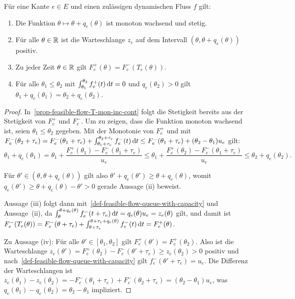 \begin{proposition}\label{prop-feasible-flow}
	Für eine Kante $e\in E$ und einen zulässigen dynamischen Fluss $f$ gilt:
	\begin{enumerate}[label=(\roman*)]
		\item\label{prop-feasible-flow-T-mon-inc-cont} Die Funktion $\theta \mapsto \theta + q_e(\theta)$ ist monoton wachsend und stetig.
		\item\label{prop-feasible-flow-positive-queue} Für alle $\theta\in\mathbb{R}$ ist die Warteschlange $z_e$ auf dem Intervall $(\theta, \theta + q_e(\theta))$ positiv.
		\item\label{prop-feasible-flow-det-outflow} Zu jeder Zeit $\theta\in\mathbb{R}$ gilt $F_e^+(\theta) = F_e^-(T_e(\theta))$.
		\item\label{prop-feasible-flow-queue-delay} Für alle $\theta_1 \leq \theta_2$ mit $\int_{\theta_1}^{\theta_2} f^+_e(t) \mathop{}\!\mathrm{d} t = 0$ und $q_e(\theta_2)>0$ gilt $\theta_1 + q_e(\theta_1) = \theta_2 + q_e(\theta_2)$.
	\end{enumerate}
\end{proposition}
\begin{proof}
	In~\ref{prop-feasible-flow-T-mon-inc-cont} folgt die Stetigkeit bereits aus der Stetigkeit von $F_e^+$ und $F_e^-$.
	Um zu zeigen, dass die Funktion monoton wachsend ist, seien $\theta_1 \leq \theta_2$ gegeben.
	Mit der Monotonie von $F_e^+$ und mit $F_e^-(\theta_2 + \tau_e) = F_e^-(\theta_1+\tau_e) + \int_{\theta_1+\tau_e}^{\theta_2+\tau_e} f_e^-(t)\mathop{}\!\mathrm{d} t\leq F_e^-(\theta_1 + \tau_e) + (\theta_2 - \theta_1)u_e$ gilt: 
	\[
		\theta_1 + q_e(\theta_1)
		= \theta_1 + \frac{F_e^+(\theta_1) - F_e^-(\theta_1 + \tau_e)}{u_e}
		\leq \theta_1 + \frac{F_e^+(\theta_2) - F_e^-(\theta_1+\tau_e)}{u_e} \leq \theta_2 + q_e(\theta_2).
	\]
	
	Für $\theta'\in (\theta, \theta+q_e(\theta))$ gilt also $\theta' + q_e(\theta') \geq \theta + q_e(\theta)$, womit $q_e(\theta') \geq \theta + q_e(\theta) - \theta' > 0$ gerade Aussage (ii) beweist.
	
	Aussage (iii) folgt dann mit~\ref{def-feasible-flow-queue-with-capacity} und Aussage~(ii), da
	$\int_{\theta}^{\theta + q_e(\theta)}f_e^-(t + \tau_e) \mathop{}\!\mathrm{d} t = q_e(\theta)  u_e = z_e(\theta)$ gilt, und damit ist $F_e^-(T_e(\theta)) = F_e^-(\theta+\tau_e) + \int_{\theta+\tau_e}^{\theta+\tau_e+q_e(\theta)}f_e^-(t)\mathop{}\!\mathrm{d} t = F_e^+(\theta)$.
	
	Zu Aussage (iv):
	Für alle $\theta'\in [\theta_1, \theta_2]$ gilt $F_e^+(\theta') = F_e^+(\theta_2)$.
	Also ist die Warteschlange $z_e(\theta') = F_e^+(\theta_2) - F_e^-(\theta' + \tau_e) \geq z_e(\theta_2) > 0$ positiv und nach~\ref{def-feasible-flow-queue-with-capacity} gilt $f_e^-(\theta' + \tau_e)=u_e$.
	Die Differenz der Warteschlangen ist
	$z_e(\theta_1)-z_e(\theta_2)=-F^-_e(\theta_1 + \tau_e) + F^-_e(\theta_2 + \tau_e) = (\theta_2 - \theta_1)u_e$, was $q_e(\theta_1) - q_e(\theta_2) = \theta_2 - \theta_1$ impliziert.
\end{proof}